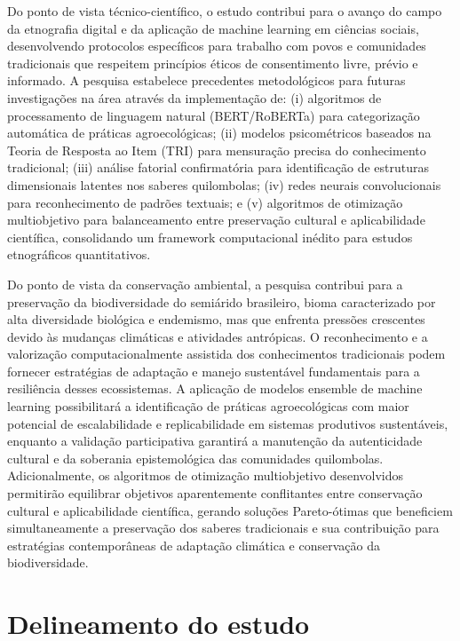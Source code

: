 Do ponto de vista técnico-científico, o estudo contribui para o avanço do campo da etnografia digital e da aplicação de machine learning em ciências sociais, desenvolvendo protocolos específicos para trabalho com povos e comunidades tradicionais que respeitem princípios éticos de consentimento livre, prévio e informado. A pesquisa estabelece precedentes metodológicos para futuras investigações na área através da implementação de: (i) algoritmos de processamento de linguagem natural (BERT/RoBERTa) para categorização automática de práticas agroecológicas; (ii) modelos psicométricos baseados na Teoria de Resposta ao Item (TRI) para mensuração precisa do conhecimento tradicional; (iii) análise fatorial confirmatória para identificação de estruturas dimensionais latentes nos saberes quilombolas; (iv) redes neurais convolucionais para reconhecimento de padrões textuais; e (v) algoritmos de otimização multiobjetivo para balanceamento entre preservação cultural e aplicabilidade científica, consolidando um framework computacional inédito para estudos etnográficos quantitativos.

Do ponto de vista da conservação ambiental, a pesquisa contribui para a preservação da biodiversidade do semiárido brasileiro, bioma caracterizado por alta diversidade biológica e endemismo, mas que enfrenta pressões crescentes devido às mudanças climáticas e atividades antrópicas. O reconhecimento e a valorização computacionalmente assistida dos conhecimentos tradicionais podem fornecer estratégias de adaptação e manejo sustentável fundamentais para a resiliência desses ecossistemas. A aplicação de modelos ensemble de machine learning possibilitará a identificação de práticas agroecológicas com maior potencial de escalabilidade e replicabilidade em sistemas produtivos sustentáveis, enquanto a validação participativa garantirá a manutenção da autenticidade cultural e da soberania epistemológica das comunidades quilombolas. Adicionalmente, os algoritmos de otimização multiobjetivo desenvolvidos permitirão equilibrar objetivos aparentemente conflitantes entre conservação cultural e aplicabilidade científica, gerando soluções Pareto-ótimas que beneficiem simultaneamente a preservação dos saberes tradicionais e sua contribuição para estratégias contemporâneas de adaptação climática e conservação da biodiversidade.

\section{Delineamento do estudo}

